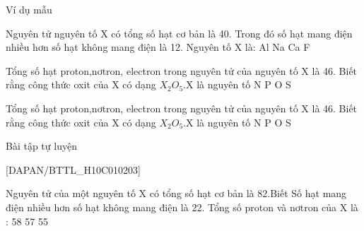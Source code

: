 \begin{vdm}{Ví dụ mẫu}
\end{vdm}

\begin{vdex}[2]
	Nguyên tử nguyên tố X có tổng số hạt cơ bản là 40. Trong đó số hạt mang điện nhiều hơn số hạt không mang điện là 12. Nguyên tố X là:
	\choice
	{%
\True	Al
}
	{%
	Na
}
	{%
	Ca
}
	{%
	F
}

\end{vdex}

\begin{vdex}[2]
	Tổng số hạt proton,nơtron, electron trong nguyên tử của nguyên tố X là 46. Biết rằng công thức oxit của X có dạng $ X_{2}O_{5} $.X là nguyên tố
	\choice
{%
	N
}
{%
\True	P
}
{%
	O
}
{%
	S
}
\huongdan{
}
\end{vdex}


\begin{vdex}[2]
	Tổng số hạt proton,nơtron, electron trong nguyên tử của nguyên tố X là 46. Biết rằng công thức oxit của X có dạng $ X_{2}O_{5} $.X là nguyên tố
	\choice
	{%
		N
	}
	{%
		\True	P
	}
	{%
		O
	}
	{%
		S
	}
	\huongdan{
	}
\end{vdex}

\begin{bttl}{Bài tập tự luyện}
\end{bttl}
[DAPAN/BTTL_H10C010203]
\setcounter{tcb@cnt@exbox}{0}
\begin{ex}[2]
	Nguyên tử của một nguyên tố X có tổng số hạt cơ  bản là 82.Biết Số hạt mang điện nhiều hơn số hạt không mang điện là 22. Tổng số proton và nơtron của X là :
	\choice
	{%
	58
}
	{%
	57
}
	{%
}
	{%
	55
}

\end{ex}


